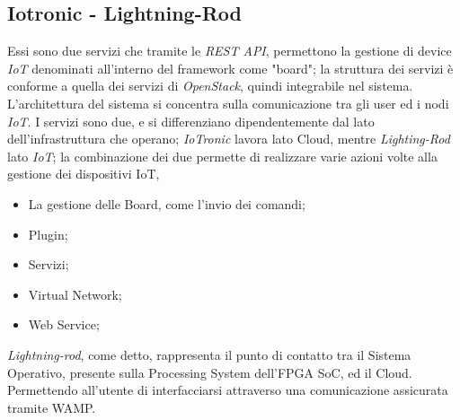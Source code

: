 \subsection{Iotronic - Lightning-Rod}
Essi sono due servizi che tramite le \textit{REST API}, permettono la gestione di device \textit{IoT} denominati all'interno del framework come "board"; la struttura dei servizi è conforme a quella dei servizi di \textit{OpenStack}, quindi integrabile nel sistema.\\
L'architettura del sistema si concentra sulla comunicazione tra gli user ed i nodi \textit{IoT}. I servizi sono due, e si differenziano dipendentemente dal lato dell'infrastruttura che operano; \textit{IoTronic} lavora lato Cloud, mentre \textit{Lighting-Rod} lato \textit{IoT}; la combinazione dei due permette di realizzare varie azioni volte alla gestione dei dispositivi IoT,
\begin{itemize}
    \item La gestione delle Board, come l'invio dei comandi;
    \item Plugin;
    \item Servizi;
    \item Virtual Network;
    \item Web Service;
\end{itemize}
\textit{Lightning-rod}, come detto, rappresenta il punto di contatto tra il Sistema Operativo, presente sulla Processing System dell'FPGA SoC, ed il Cloud. Permettendo all'utente di interfacciarsi attraverso una comunicazione assicurata tramite WAMP.
